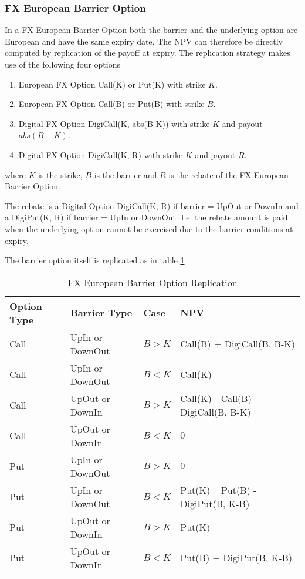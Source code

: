 \subsubsection{FX European Barrier Option}
\label{pricing:fx_europeanbarrieroption}

In a FX European Barrier Option both the barrier and the underlying option are European and have the same expiry
date. The NPV can therefore be directly computed by replication of the payoff at expiry. The replication strategy makes
use of the following four options

\begin{enumerate}
\item European FX Option Call(K) or Put(K) with strike $K$.
\item European FX Option Call(B) or Put(B) with strike $B$.
\item Digital FX Option DigiCall(K, abs(B-K)) with strike $K$ and payout $abs(B-K)$.
\item Digital FX Option DigiCall(K, R) with strike $K$ and payout $R$.
\end{enumerate}

where $K$ is the strike, $B$ is the barrier and $R$ is the rebate of the FX European Barrier Option.

The rebate is a Digital Option DigiCall(K, R) if barrier = UpOut or DownIn and a DigiPut(K, R) if barrier = UpIn or
DownOut.  I.e. the rebate amount is paid when the underlying option cannot be exercised due to the barrier conditions at
expiry.

The barrier option itself is replicated as in table \ref{tab:fx_europeanbarrieroption_replication}

\begin{table}[h]
  \begin{tabular}{l|l|l|l}
    Option Type & Barrier Type & Case & NPV \\ \hline
    Call & UpIn or DownOut & $B > K$ & Call(B) + DigiCall(B, B-K) \\
    Call & UpIn or DownOut & $B < K$ & Call(K) \\
    Call & UpOut or DownIn & $B > K$ & Call(K)  - Call(B) -DigiCall(B, B-K) \\
    Call & UpOut or DownIn & $B < K$ & $0$ \\
    Put & UpIn or DownOut & $B > K$ & $0$ \\
    Put & UpIn or DownOut & $B < K$ & Put(K) – Put(B) - DigiPut(B, K-B) \\
    Put & UpOut or DownIn & $B > K$ & Put(K) \\
    Put & UpOut or DownIn & $B < K$ & Put(B) + DigiPut(B, K-B) \\
  \end{tabular}
  \caption{FX European Barrier Option Replication}
  \label{tab:fx_europeanbarrieroption_replication}
\end{table}
